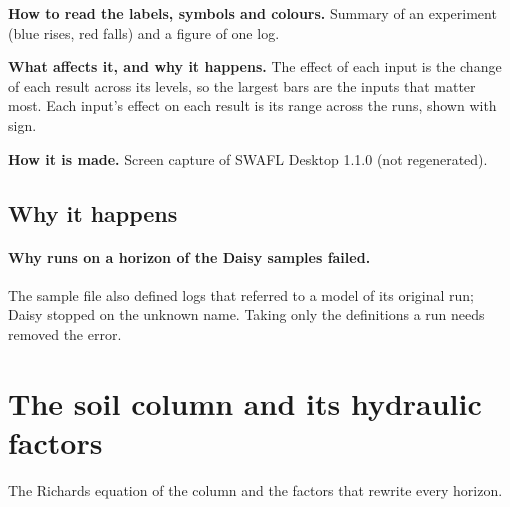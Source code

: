 \textbf{How to read the labels, symbols and colours.} Summary of an experiment (blue rises, red falls) and a figure of one log.

\textbf{What affects it, and why it happens.} The effect of each input is the change of each result across its levels, so the largest bars are the inputs that matter most. Each input's effect on each result is its range across the runs, shown with sign.

\textbf{How it is made.} Screen capture of SWAFL Desktop 1.1.0 (not regenerated).


\subsection{Why it happens}
\paragraph{Why runs on a horizon of the Daisy samples failed.} The sample file also defined logs that referred to a model of its original run; Daisy stopped on the unknown name. Taking only the definitions a run needs removed the error.

\section{The soil column and its hydraulic factors}
The Richards equation of the column and the factors that rewrite every horizon.

